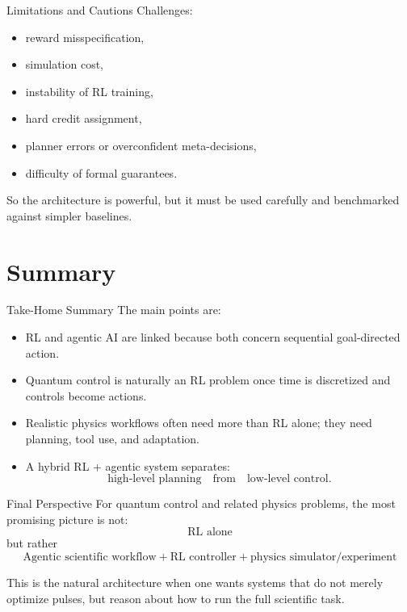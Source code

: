 \documentclass[aspectratio=169]{beamer}
\begin{document}
\begin{frame}{Limitations and Cautions}
Challenges:
\begin{itemize}
    \item reward misspecification,
    \item simulation cost,
    \item instability of RL training,
    \item hard credit assignment,
    \item planner errors or overconfident meta-decisions,
    \item difficulty of formal guarantees.
\end{itemize}

So the architecture is powerful, but it must be used carefully and benchmarked against simpler baselines.
\end{frame}

\section{Summary}

\begin{frame}{Take-Home Summary}
The main points are:
\begin{itemize}
    \item RL and agentic AI are linked because both concern sequential goal-directed action.
    \item Quantum control is naturally an RL problem once time is discretized and controls become actions.
    \item Realistic physics workflows often need more than RL alone; they need planning, tool use, and adaptation.
    \item A hybrid RL + agentic system separates:
    \[
    \text{high-level planning} \quad \text{from} \quad \text{low-level control}.
    \]
\end{itemize}
\end{frame}

\begin{frame}{Final Perspective}
For quantum control and related physics problems, the most promising picture is not:
\[
\text{RL alone}
\]
but rather
\[
\boxed{
\text{Agentic scientific workflow} + \text{RL controller} + \text{physics simulator/experiment}
}
\]

This is the natural architecture when one wants systems that do not merely optimize pulses, but reason about how to run the full scientific task.
\end{frame}
\end{document}
